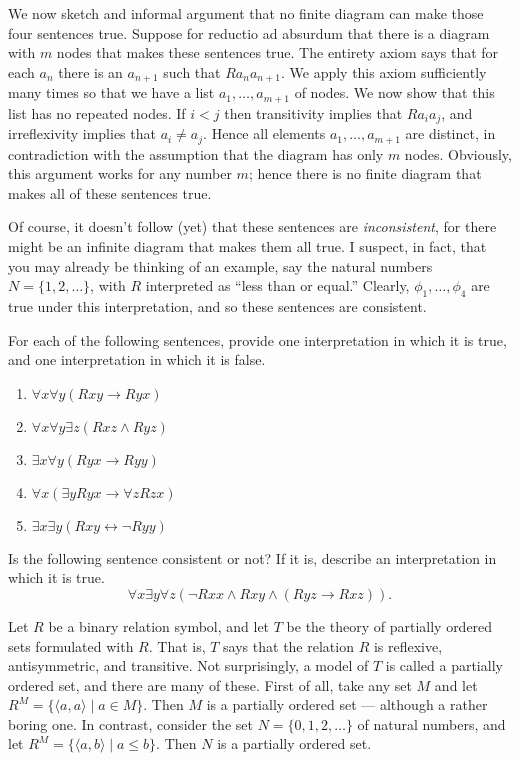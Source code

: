 We now sketch and informal argument that no finite diagram can make
those four sentences true.  Suppose for reductio ad absurdum that
there is a diagram with $m$ nodes that makes these sentences true.
The entirety axiom says that for each $a_n$ there is an $a_{n+1}$ such
that $Ra_na_{n+1}$.  We apply this axiom sufficiently many times so
that we have a list $a_1,\dots ,a_{m+1}$ of nodes.  We now show that
this list has no repeated nodes.  If $i<j$ then transitivity implies
that $Ra_ia_j$, and irreflexivity implies that $a_i\neq a_j$.  Hence
all elements $a_1,\dots ,a_{m+1}$ are distinct, in contradiction with
the assumption that the diagram has only $m$ nodes. Obviously, this
argument works for any number $m$; hence there is no finite diagram
that makes all of these sentences true.

Of course, it doesn't follow (yet) that these sentences are {\it
  inconsistent}, for there might be an infinite diagram that makes
them all true.  I suspect, in fact, that you may already be thinking
of an example, say the natural numbers $N=\{ 1,2,\dots \}$, with $R$
interpreted as ``less than or equal.''  Clearly,
$\phi _1,\dots ,\phi _4$ are true under this interpretation, and so
these sentences are consistent.

\begin{exercises} For each of the following sentences, provide one
  interpretation in which it is true, and one interpretation in which
  it is false.
  \begin{enumerate}
  \item $\forall x\forall y(Rxy\to Ryx)$
  \item $\forall x\forall y\exists z(Rxz\wedge Ryz)$  
  \item $\exists x\forall y (Ryx\to Ryy)$
  \item $\forall x(\exists yRyx\to \forall zRzx)$
  \item $\exists x\exists y (Rxy\leftrightarrow \neg Ryy)$  
  \end{enumerate}
\end{exercises}

\begin{exercise} Is the following sentence consistent or not?  If it
  is, describe an interpretation in which it is true.
  \[ \forall x\exists y\forall z(\neg Rxx\wedge Rxy\wedge (Ryz\to
    Rxz)) .\]
\end{exercise}

\begin{example} Let $R$ be a binary relation symbol, and let $T$ be
  the theory of partially ordered sets formulated with $R$.  That is,
  $T$ says that the relation $R$ is reflexive, antisymmetric, and
  transitive.  Not surprisingly, a model of $T$ is called a partially
  ordered set, and there are many of these.  First of all, take any
  set $M$ and let $R^M=\{ \langle a,a\rangle \mid a\in M\}$.  Then $M$
  is a partially ordered set --- although a rather boring one.  In
  contrast, consider the set $N=\{ 0,1,2,\dots \}$ of natural numbers,
  and let $R^M=\{ \langle a,b\rangle \mid a\leq b\}$.  Then $N$ is a
  partially ordered set.
\end{example}

